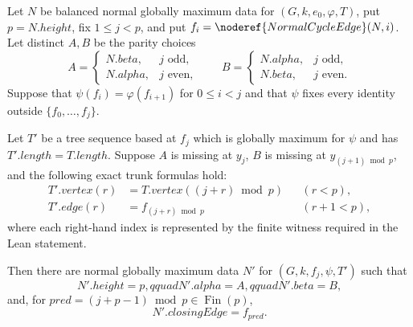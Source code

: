 \begin{helper}
Let $N$ be balanced normal globally maximum data for
$(G,k,e_0,\varphi,T)$, put $p=N.height$, fix $1\leq j<p$, and put
$f_i=\noderef{NormalCycleEdge}(N,i)$.  Let distinct $A,B$ be the parity
choices
\[
 A=\begin{cases}N.beta,&j\text{ odd},\\N.alpha,&j\text{ even},\end{cases}
 \qquad
 B=\begin{cases}N.alpha,&j\text{ odd},\\N.beta,&j\text{ even}.
 \end{cases}
\]
Suppose that $\psi(f_i)=\varphi(f_{i+1})$ for $0\leq i<j$ and that
$\psi$ fixes every identity outside $\{f_0,\ldots,f_j\}$.

Let $T'$ be a tree sequence based at $f_j$ which is globally maximum for
$\psi$ and has $T'.length=T.length$.  Suppose $A$ is missing at $y_j$,
$B$ is missing at $y_{(j+1)\bmod p}$, and the following exact trunk
formulas hold:
\[
 \begin{aligned}
 T'.vertex(r)&=T.vertex((j+r)\bmod p) &&(r<p),\\
 T'.edge(r)&=f_{(j+r)\bmod p} &&(r+1<p),
 \end{aligned}                                                   \tag{1}
\]
where each right-hand index is represented by the finite witness required
in the Lean statement.

Then there are normal globally maximum data $N'$ for
$(G,k,f_j,\psi,T')$ such that
\[
 N'.height=p,qquad N'.alpha=A,qquad N'.beta=B,
\]
and, for
$pred=(j+p-1)\bmod p\in\operatorname{Fin}(p)$,
\[
 N'.closingEdge=f_{pred}.
\]
\end{helper}

